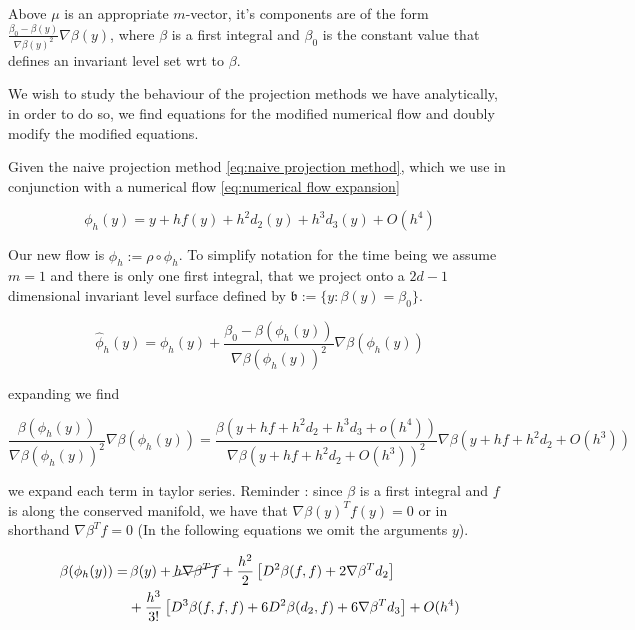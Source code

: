 \documentclass[12pt]{article}
\begin{document}
Above $\mu$ is an appropriate $m$-vector, it's components are of the form $\frac{\beta_0 - \beta(y)}{\nabla\beta(y)^2}\nabla\beta(y)$, where $\beta$ is a first integral and $\beta_0$ is the constant value that defines an invariant level set wrt to $\beta$.

We wish to study the behaviour of the projection methods we have analytically, in order to do so, we find equations for the modified numerical flow and doubly modify the modified equations.

Given the naive projection method \eqref{eq:naive projection method}, which we use in conjunction with a numerical flow \eqref{eq:numerical flow expansion}

\begin{equation}\label{eq:numerical flow expansion}
    \phi_h(y) = y + hf(y) + h^2d_2(y) + h^3d_3(y) + O(h^4)
\end{equation}

Our new flow is $\hat \phi_h := \rho\circ\phi_h$. To simplify notation for the time being we assume $m=1$ and there is only one first integral, that we project onto a $2d-1$ dimensional invariant level surface defined by $\mathfrak b := \{y : \beta(y) = \beta_0\}$. 

\begin{equation}\label{eq:modified numerical flow projected}
    \hat \phi_h(y) = \phi_h(y) + \frac{\beta_0 - \beta(\phi_h(y))}{\nabla\beta(\phi_h(y))^2}\nabla\beta(\phi_h(y))
\end{equation}

expanding we find

\begin{equation}\label{eq:projection modification} 
\frac{\beta(\phi_h(y))}{\nabla\beta(\phi_h(y))^2}\nabla\beta(\phi_h(y))
= \frac{\beta(y + hf + h^2d_2 + h^3d_3 + o(h^4))}{\nabla\beta(y + hf + h^2d_2+O(h^3))^2}\nabla\beta(y + hf + h^2d_2 + O(h^3)) 
\end{equation}

we expand each term in taylor series. Reminder : since $\beta$ is a first integral and $f$ is along the conserved manifold, we have that $\nabla\beta(y)^T f(y) = 0$ or in shorthand $\nabla\beta^Tf =0$ (In the following equations we omit the arguments $y$). 

\begin{equation}\label{eq:term 1 e}
\begin{split}
    \beta(\phi_h(y)) = & \, \beta(y) + \cancel{h\nabla\beta^T f} + \frac{h^2}{2}\left[ D^2\beta(f,f) + 2\nabla\beta^T d_2 \right]\\
    & + \frac{h^3}{3!}\left[ D^3\beta(f,f,f) + 6D^2\beta(d_2,f) + 6\nabla\beta^T d_3 \right] + O(h^4)
\end{split}
\end{equation}
\end{document}
